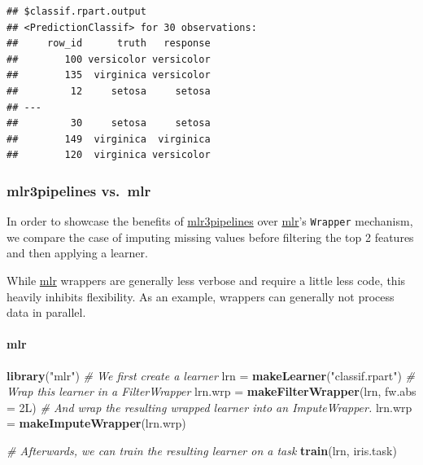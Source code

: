 \documentclass[]{article}
\newenvironment{Shaded}{\begin{snugshade}}{\end{snugshade}}
\newcommand{\CommentTok}[1]{\textcolor[rgb]{0.56,0.35,0.01}{\textit{#1}}}
\newcommand{\DataTypeTok}[1]{\textcolor[rgb]{0.13,0.29,0.53}{#1}}
\newcommand{\KeywordTok}[1]{\textcolor[rgb]{0.13,0.29,0.53}{\textbf{#1}}}
\newcommand{\NormalTok}[1]{#1}
\newcommand{\OperatorTok}[1]{\textcolor[rgb]{0.81,0.36,0.00}{\textbf{#1}}}
\newcommand{\StringTok}[1]{\textcolor[rgb]{0.31,0.60,0.02}{#1}}
\let\oldparagraph\paragraph
\renewcommand{\paragraph}[1]{\oldparagraph{#1}\mbox{}}
\renewenvironment{Shaded} {\begin{snugshade}\small} {\end{snugshade}}
\begin{document}
\begin{Shaded}
\end{Shaded}

\begin{verbatim}
## $classif.rpart.output
## <PredictionClassif> for 30 observations:
##     row_id      truth   response
##        100 versicolor versicolor
##        135  virginica versicolor
##         12     setosa     setosa
## ---                             
##         30     setosa     setosa
##        149  virginica  virginica
##        120  virginica versicolor
\end{verbatim}

\hypertarget{mlr3pipelines-vs.mlr}{%
\subsubsection{mlr3pipelines vs.~mlr}\label{mlr3pipelines-vs.mlr}}

In order to showcase the benefits of \href{https://cran.r-project.org/package=mlr3pipelines}{mlr3pipelines} over \href{https://cran.r-project.org/package=mlr}{mlr}'s \texttt{Wrapper} mechanism, we compare the case of imputing missing values before filtering the top 2 features and then applying a learner.

While \href{https://cran.r-project.org/package=mlr}{mlr} wrappers are generally less verbose and require a little less code, this heavily inhibits flexibility.
As an example, wrappers can generally not process data in parallel.

\hypertarget{mlr}{%
\paragraph{mlr}\label{mlr}}

\begin{Shaded}
\begin{Highlighting}[]
\KeywordTok{library}\NormalTok{(}\StringTok{"mlr"}\NormalTok{)}
\CommentTok{# We first create a learner}
\NormalTok{lrn =}\StringTok{ }\KeywordTok{makeLearner}\NormalTok{(}\StringTok{"classif.rpart"}\NormalTok{)}
\CommentTok{# Wrap this learner in a FilterWrapper}
\NormalTok{lrn.wrp =}\StringTok{ }\KeywordTok{makeFilterWrapper}\NormalTok{(lrn, }\DataTypeTok{fw.abs =}\NormalTok{ 2L)}
\CommentTok{# And wrap the resulting wrapped learner into an ImputeWrapper.}
\NormalTok{lrn.wrp =}\StringTok{ }\KeywordTok{makeImputeWrapper}\NormalTok{(lrn.wrp)}

\CommentTok{# Afterwards, we can train the resulting learner on a task}
\KeywordTok{train}\NormalTok{(lrn, iris.task)}
\end{Highlighting}
\end{Shaded}
\end{document}
